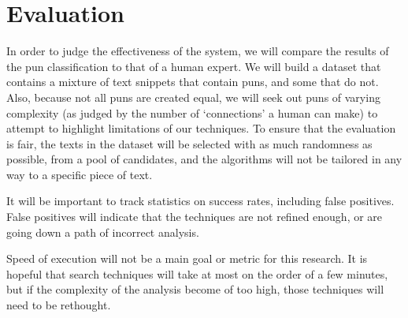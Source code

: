 \section{Evaluation}

In order to judge the effectiveness of the system, we will compare the results of the pun classification to that of a human expert. We will build a dataset that contains a mixture of text snippets that contain puns, and some that do not. Also, because not all puns are created equal, we will seek out puns of varying complexity (as judged by the number of `connections' a human can make) to attempt to highlight limitations of our techniques. To ensure that the evaluation is fair, the texts in the dataset will be selected with as much randomness as possible, from a pool of candidates, and the algorithms will not be tailored in any way to a specific piece of text.

It will be important to track statistics on success rates, including false positives. False positives will indicate that the techniques are not refined enough, or are going down a path of incorrect analysis.

Speed of execution will not be a main goal or metric for this research. It is hopeful that search techniques will take at most on the order of a few minutes, but if the complexity of the analysis become of too high, those techniques will need to be rethought.

